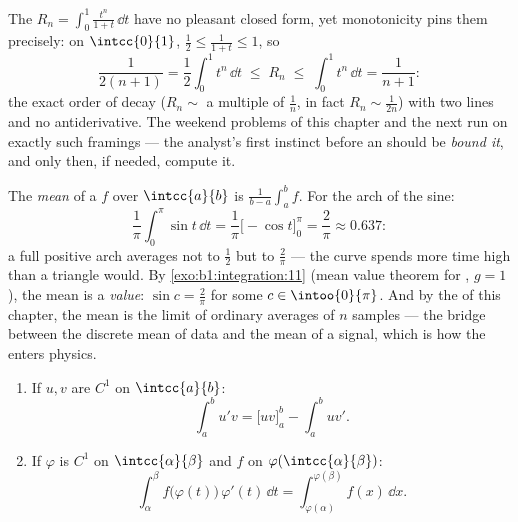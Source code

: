 \begin{example}\label{ex:b1:integration:estimate}
The  $R_n = \int_0^1 \frac{t^n}{1 + t}\,\dd t$ have no
pleasant closed form, yet monotonicity pins them precisely: on
$\intcc{0}{1}$, $\frac12 \leq \frac{1}{1+t} \leq 1$, so
\[
\frac{1}{2(n+1)} = \frac12\int_0^1 t^n\,\dd t
\;\leq\; R_n \;\leq\; \int_0^1 t^n \,\dd t = \frac{1}{n+1} :
\]
the exact order of decay ($R_n \sim$ a multiple of $\frac1n$,
in fact $R_n \sim \frac{1}{2n}$) with two lines and no
antiderivative. The weekend problems of this chapter and the
next run on exactly such framings --- the analyst's first
instinct before an  should be \emph{bound it}, and only
then, if needed, compute it.
\end{example}

\begin{example}\label{ex:b1:integration:average}
The \emph{mean} of a  $f$ over $\intcc{a}{b}$ is
$\frac{1}{b-a}\int_a^b f$. For the arch of the sine:
\[
\frac{1}{\pi}\int_0^\pi \sin t\,\dd t
= \frac{1}{\pi}\bigl[-\cos t\bigr]_0^\pi = \frac{2}{\pi}
\approx 0.637 :
\]
a full positive arch averages not to $\frac12$ but to
$\frac2\pi$ --- the curve spends more time high than a triangle
would. By \cref{exo:b1:integration:11} (mean value theorem for
, $g = 1$), the mean is a \emph{value}: $\sin c =
\frac2\pi$ for some $c \in \intoo{0}{\pi}$. And by the  of this chapter, the mean is the limit of ordinary
averages of $n$ samples --- the bridge between the discrete
mean of data and the  mean of a signal, which is how
the  enters physics.
\end{example}

\begin{theorem}\label{thm:b1:integration:parts}
\begin{enumerate}
  \item If $u, v$ are $C^1$ on $\intcc{a}{b}$:
        \[
        \int_a^b u'v = \bigl[uv\bigr]_a^b - \int_a^b uv' .
        \]
  \item If $\varphi$ is $C^1$ on $\intcc{\alpha}{\beta}$ and $f$
         on $\varphi(\intcc{\alpha}{\beta})$:
        \[
        \int_{\alpha}^{\beta} f\bigl(\varphi(t)\bigr)\,\varphi'(t)\,
        \dd t = \int_{\varphi(\alpha)}^{\varphi(\beta)} f(x)\, \dd x .
        \]
\end{enumerate}
\end{theorem}

